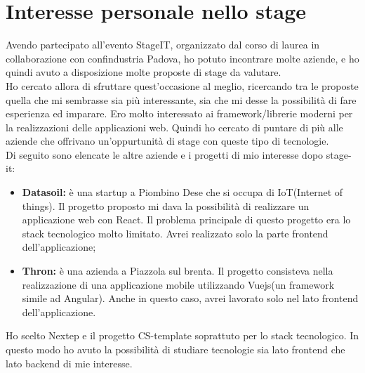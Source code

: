 \section{Interesse personale nello stage}

Avendo partecipato all’evento StageIT, organizzato dal corso di laurea in collaborazione
con confindustria Padova, ho potuto incontrare molte aziende, e ho quindi avuto a
disposizione molte proposte di stage da valutare.
\\

Ho cercato allora di sfruttare quest’occasione al meglio, ricercando tra le proposte
quella che mi sembrasse sia più interessante, sia che mi desse la possibilità di fare
esperienza ed imparare. Ero molto interessato ai framework/librerie moderni per la realizzazioni delle applicazioni web. Quindi ho cercato di puntare di più alle aziende che offrivano un'oppurtunità di stage con queste tipo di tecnologie. 
\\

Di seguito sono elencate le altre aziende e i  progetti di mio interesse dopo stage-it:
\begin{itemize}
	\item \textbf{Datasoil:} è una startup a Piombino Dese che si occupa di IoT(Internet of things). Il progetto proposto mi dava la possibilità di realizzare un applicazione web con React. Il problema principale di questo progetto era lo stack tecnologico molto limitato. Avrei realizzato solo la parte frontend dell'applicazione;
	\item \textbf{Thron:} è una azienda a Piazzola sul brenta. Il progetto consisteva nella realizzazione di una applicazione mobile utilizzando Vuejs(un framework simile ad Angular). Anche in questo caso, avrei lavorato solo nel lato frontend dell'applicazione. 
\end{itemize}
Ho scelto Nextep e il progetto CS-template soprattuto per lo stack tecnologico. In questo modo ho avuto la possibilità di studiare tecnologie sia lato frontend che lato backend di mie interesse. 


